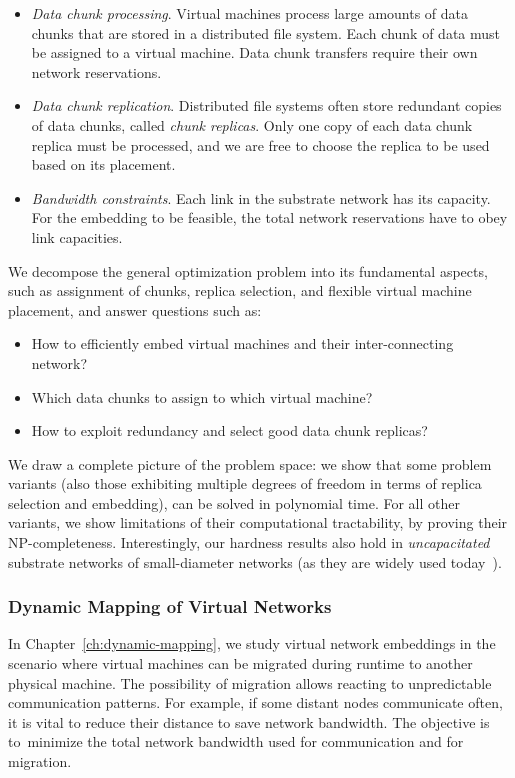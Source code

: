 \begin{itemize}
\item \emph{Data chunk processing}. Virtual machines process large amo\-unts of data chunks that are stored in a distributed file system. Each chunk of data must be assigned to a virtual machine. Data chunk transfers require their own network reservations.

\item \emph{Data chunk replication}. Distributed file systems often store redundant copies of data chunks, called \emph{chunk replicas}. Only one copy of each data chunk replica must be processed, and we are free to choose the replica to be used based on its placement.

\item \emph{Bandwidth constraints}. Each link in the substrate network has its capacity. For the embedding to be feasible, the total network reservations have to obey link capacities.
\end{itemize}


We decompose the general optimization problem into its fundamental aspects, such as
assignment of chunks, replica selection, and flexible virtual machine
placement, and answer questions such as:
\begin{itemize}
\item How to efficiently embed virtual machines and their inter-connecting network?
\item Which data chunks to assign to which virtual machine?
\item How to exploit redundancy and select good data chunk replicas?
\end{itemize}

We draw a complete picture of the problem space: we show that
some problem variants (also those exhibiting multiple degrees of freedom in terms of
replica selection and embedding),
can be solved in polynomial time. For all other variants, we show limitations of their
computational tractability, by proving their NP-completeness. Interestingly,
our hardness results also hold in \emph{uncapacitated} substrate
networks of small-diameter networks (as they are
widely used today~\cite{fattree}).


\subsubsection{Dynamic Mapping of Virtual Networks}
\label{sec:contributions-dynamic-mapping}

In Chapter~\ref{ch:dynamic-mapping}, we study virtual network embeddings in the scenario where virtual machines can be migrated during runtime to another physical machine.
The possibility of migration allows reacting to unpredictable communication patterns.
For example, if some distant nodes communicate often, it is vital to reduce their distance to save network bandwidth.
The objective is to~minimize the total network bandwidth used for communication and for migration.

